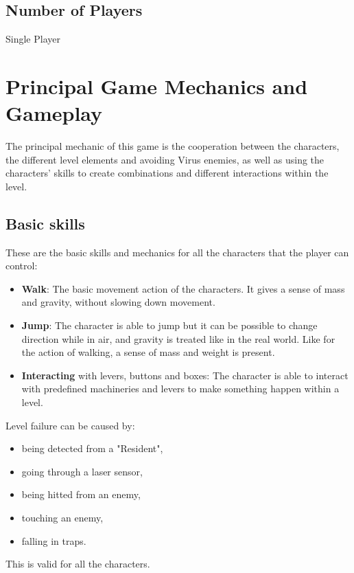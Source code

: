 \documentclass[12pt, a4paper]{report}
\begin{document}
\section*{Number of Players}
Single Player

\chapter{Principal Game Mechanics and Gameplay}
The principal mechanic of this game is the cooperation between the characters, the different level elements and avoiding Virus enemies, as well as using the characters’ skills to create combinations and different interactions within the level.

\section*{Basic skills}
These are the basic skills and mechanics for all the characters that the player can control:
\begin{itemize}
	\item \textbf{Walk}: The basic movement action of the characters. It gives a sense of mass and gravity, without slowing down movement.
	\item \textbf{Jump}: The character is able to jump but it can be possible to change direction while in air, and gravity is treated like in the real world. Like for the action of walking, a sense of mass and weight is present. 
	\item \textbf{Interacting} with levers, buttons and boxes: The character is able to interact with predefined machineries and levers to make something happen within a level.
\end{itemize}

Level failure can be caused by:
\begin{itemize}
	\item being detected from a "Resident",
	\item going through a laser sensor,
	\item being hitted from an enemy,
	\item touching an enemy,
	\item falling in traps.
\end{itemize}
This is valid for all the characters.
\end{document}
